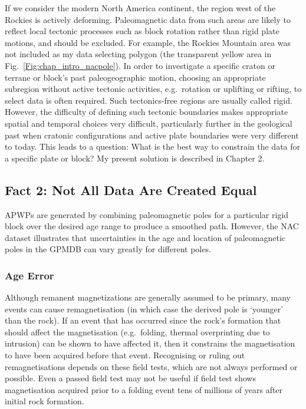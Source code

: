 If we consider the modern North America continent, the region west of the
Rockies is actively deforming. Paleomagnetic data from such areas are likely to
reflect local tectonic processes such as block rotation rather than rigid plate
motions, and should be excluded. For example, the Rockies Mountain area was not
included as my data selecting polygon (the transparent yellow area in
Fig.~\ref{Fig:chap_intro_nacpole}). In order to investigate a specific craton or
terrane or block's past paleogeographic motion, choosing an appropriate
subregion without active tectonic activities, e.g.\ rotation or uplifting or
rifting, to select data is often required. Such tectonics-free regions are
usually called rigid. However, the difficulty of defining such tectonic
boundaries makes appropriate spatial and temporal choices very difficult,
particularly further in the geological past when cratonic configurations and
active plate boundaries were very different to today. This leads to a question:
What is the best way to constrain the data for a specific plate or block? My
present solution is described in Chapter 2.

\subsection{Fact 2: Not All Data Are Created Equal}

APWPs are generated by combining paleomagnetic poles for a particular rigid
block over the desired age range to produce a smoothed path. However, the NAC
dataset illustrates that uncertainties in the age and location of paleomagnetic
poles in the GPMDB can vary greatly for different poles.

\subsubsection{Age Error}

Although remanent magnetizations are generally assumed to be primary, many
events can cause remagnetisation (in which case the derived pole is `younger'
than the rock). If an event that has occurred since the rock's formation that
should affect the magnetisation (e.g.\ folding, thermal overprinting due to
intrusion) can be shown to have affected it, then it constrains the
magnetisation to have been acquired before that event. Recognising or ruling
out remagnetisations depends on these field tests, which are not always
performed or possible. Even a passed field test may not be useful if field test
shows magnetisation acquired prior to a folding event tens of millions of years
after initial rock formation.

